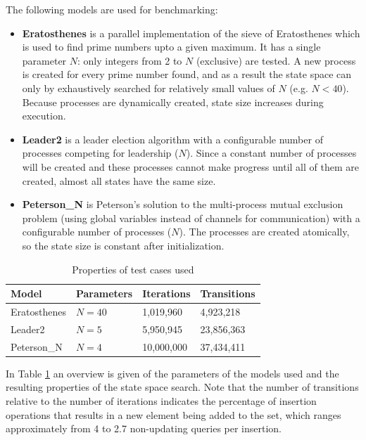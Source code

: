 \documentclass{acm_proc_article-sp}
\begin{document}

The following models are used for benchmarking:
\begin{itemize}
\item\textbf{Eratosthenes} is a parallel implementation of the sieve
of Eratosthenes which is used to find prime numbers upto a given maximum.
It has a single parameter $N$: only integers from 2 to $N$ (exclusive) are
tested. A new process is created for every prime number found, and as a result
the state space can only by exhaustively searched for relatively small values
of $N$ (e.g. $N < 40$). Because processes are dynamically created, state size
increases during execution.

\item\textbf{Leader2} is a leader election algorithm with a configurable number
of processes competing for leadership ($N$). Since a constant number of
processes will be created and these processes cannot make progress until all
of them are created, almost all states have the same size.

\item\textbf{Peterson\_N} is Peterson's solution to the multi-process mutual
exclusion problem (using global variables instead of channels for
communication) with a configurable number of processes ($N$). The processes
are created atomically, so the state size is constant after initialization.
\end{itemize}

\begin{table}
\begin{center}
\begin{tabular}{ l l l l }
\hline
\textbf{Model} & \textbf{Parameters} & \textbf{Iterations} & \textbf{Transitions} \\
\hline
Eratosthenes & $N=40$ &  1,019,960 &  4,923,218 \\
Leader2      & $N=5$  &  5,950,945 & 23,856,363 \\
Peterson\_N  & $N=4$  & 10,000,000 & 37,434,411 \\
\hline
\end{tabular}
\caption{Properties of test cases used}
\label{tab-cases}
\end{center}
\end{table}

In Table \ref{tab-cases} an overview is given of the parameters of the models used
and the resulting properties of the state space search.
Note that the number of transitions relative to the number of iterations indicates
the percentage of insertion operations that results in a new element being added
to the set, which ranges approximately from 4 to 2.7 non-updating queries per
insertion.
\end{document}

